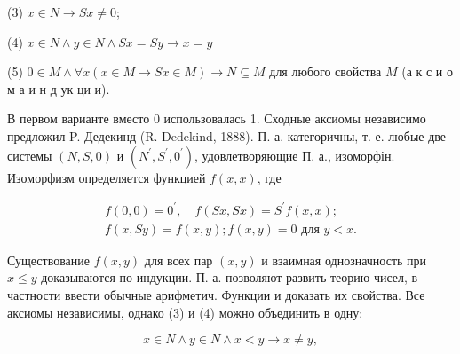 \documentclass[10pt]{article}
\begin{document}
(3) $x \in N \longrightarrow S x \neq 0$;



(4) $x \in N \wedge y \in N \wedge S x=S y \longrightarrow x=y$



(5) $0 \in M \wedge \forall x(x \in M \longrightarrow S x \in M) \longrightarrow N \subseteq M$ для любого свойства $M$ (а к с и о м а и н д ук ци и).



В первом варианте вместо 0 использовалась 1. Сходные аксиомы независимо предложил P. Дедекинд (R. Dedekind, 1888). П. а. категоричны, т. е. любые две системы $(N, S, 0)$ и $\left(N^{\prime}, S^{\prime}, 0^{\prime}\right)$, удовлетворяющие П. а., изоморфін. Изоморфизм определяется функцией $f(x, x)$, где



\[

\begin{gathered}

f(0,0)=0^{\prime}, \quad f(S x, S x)=S^{\prime} f(x, x) ; \\

f(x, S y)=f(x, y) ; f(x, y)=0 \text { для } y<x .

\end{gathered}

\]



Существование $f(x, y)$ для всех пар $(x, y)$ и взаимная однозначность при $x \leqslant y$ доказываются по индукции. П. а. позволяют развить теорию чисел, в частности ввести обычные арифметич. Функции и доказать их свойства. Все аксиомы независимы, однако (3) и (4) можно объединить в одну:



\[

x \in N \wedge y \in N \wedge x<y \rightarrow x \neq y,

\]
\end{document}
